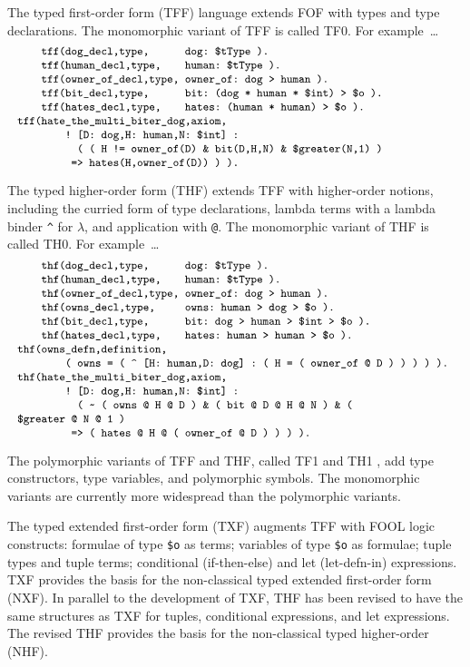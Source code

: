 \documentclass[runningheads]{llncs}
\begin{document}
The typed first-order form (TFF) language extends FOF with types and type declarations.
The monomorphic variant of TFF is called TF0.
For example~\ldots 
\[
\begin{minipage}{\textwidth}
\small
\begin{verbatim}
    tff(dog_decl,type,      dog: $tType ).
    tff(human_decl,type,    human: $tType ).
    tff(owner_of_decl,type, owner_of: dog > human ).
    tff(bit_decl,type,      bit: (dog * human * $int) > $o ).
    tff(hates_decl,type,    hates: (human * human) > $o ).
    
    tff(hate_the_multi_biter_dog,axiom,
        ! [D: dog,H: human,N: $int] :
          ( ( H != owner_of(D) & bit(D,H,N) & $greater(N,1) )
         => hates(H,owner_of(D)) ) ).
\end{verbatim}
\end{minipage}
\]

The typed higher-order form (THF) extends TFF with higher-order notions, including the
curried form of type declarations, lambda terms with a lambda 
binder {\tt \verb|^|} for $\lambda$, and application with {\tt @}.
The monomorphic variant of THF is called TH0.
For example~\ldots
\[
\begin{minipage}{\textwidth}
\small
\begin{verbatim}
    thf(dog_decl,type,      dog: $tType ).
    thf(human_decl,type,    human: $tType ).
    thf(owner_of_decl,type, owner_of: dog > human ).
    thf(owns_decl,type,     owns: human > dog > $o ).
    thf(bit_decl,type,      bit: dog > human > $int > $o ).
    thf(hates_decl,type,    hates: human > human > $o ).

    thf(owns_defn,definition,
        ( owns = ( ^ [H: human,D: dog] : ( H = ( owner_of @ D ) ) ) ) ).

    thf(hate_the_multi_biter_dog,axiom,
        ! [D: dog,H: human,N: $int] :
          ( ~ ( owns @ H @ D ) & ( bit @ D @ H @ N ) & ( $greater @ N @ 1 ) 
         => ( hates @ H @ ( owner_of @ D ) ) ) ).
\end{verbatim}
\end{minipage}
\]

The polymorphic variants of TFF and THF, called TF1 \cite{BP13-TFF1} and TH1 \cite{KSR16},
add type constructors, type variables, and polymorphic symbols.
The monomorphic variants are currently more widespread than the polymorphic variants.

The typed extended first-order form (TXF) \cite{SK18} augments TFF with FOOL logic \cite{KKV15} 
constructs:
formulae of type {\tt \$o} as terms; 
variables of type {\tt \$o} as formulae;
tuple types and tuple terms;
conditional (if-then-else) and let (let-defn-in) expressions.
TXF provides the basis for the non-classical typed extended first-order form (NXF).
In parallel to the development of TXF, THF has been revised to have the same structures as TXF 
for tuples, conditional expressions, and let expressions. 
The revised THF provides the basis for the non-classical typed higher-order (NHF).
\end{document}
